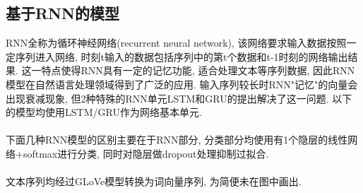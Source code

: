 \documentclass[a4paper]{article}
\begin{document}
	\subsection{基于RNN的模型}
	RNN全称为循环神经网络(recurrent neural network), 该网络要求输入数据按照一定序列进入网络, 时刻t输入的数据包括序列中的第t个数据和t-1时刻的网络输出结果. 这一特点使得RNN具有一定的记忆功能, 适合处理文本等序列数据, 因此RNN模型在自然语言处理领域得到了广泛的应用. 输入序列较长时RNN"记忆"的向量会出现衰减现象, 但2种特殊的RNN单元LSTM\cite{gers2000learning}和GRU\cite{chung2014empirical}的提出解决了这一问题. 以下的模型均使用LSTM/GRU作为网络基本单元.\\\\
	下面几种RNN模型的区别主要在于RNN部分, 分类部分均使用有1个隐层的线性网络+softmax进行分类, 同时对隐层做dropout处理抑制过拟合.\\\\
	文本序列均经过GLoVe模型转换为词向量序列, 为简便未在图中画出.
\end{document}
